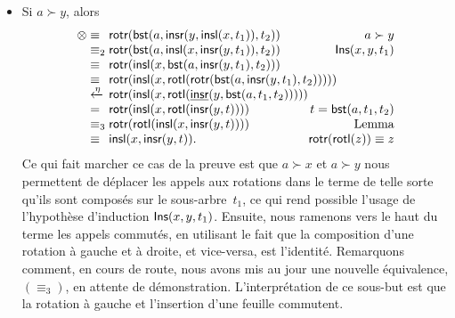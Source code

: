 \begin{itemize}
\begin{itemize}
    \item Si \(a \succ y\), alors
      \begin{equation*}
      \begin{array}{@{}r@{\;}l@{\;}l@{\hspace{-8mm}}r@{}}
        \otimes & \equiv &
        \fun{rotr}(\fun{bst}(a,\fun{insr}(y,\fun{insl}(x,t_1)),t_2))
        & \IH{a \succ y}\\
        & \equiv_2 & \fun{rotr}(\fun{bst}(a,\fun{insl}(x,
        \fun{insr}(y,t_1)),t_2))
        & \IH{\pred{Ins}{x,y,t_1}}\\
        & \equiv & \fun{rotr}(\fun{insl}(x,
        \fun{bst}(a,\fun{insr}(y,t_1),t_2)))\\
        & \equiv & \fun{rotr}(\fun{insl}(x,
        \fun{rotl}(\fun{rotr}(\fun{bst}(a,\fun{insr}(y,t_1),t_2)))))\\
        & \xleftarrow{\smash{\eta}} &
        \fun{rotr}(\fun{insl}(x,\fun{rotl}(\ufun{insr}(y,
        \fun{bst}(a,t_1,t_2)))))\\
        & = & \fun{rotr}(\fun{insl}(x,\fun{rotl}(\fun{insr}(y,t))))
        & \IH{t=\fun{bst}(a,t_1,t_2)}\\
        & \equiv_3 & \fun{rotr}(\fun{rotl}(\fun{insl}(x,
        \fun{insr}(y,t)))) & \IH{\text{Lemma}}\\
        & \equiv & \fun{insl}(x,\fun{insr}(y,t)).
        & \IH{\fun{rotr}(\fun{rotl}(z)) \equiv z}
      \end{array}
      \end{equation*}
      Ce qui fait marcher ce cas de la preuve est que \(a \succ x\) et
      \(a \succ y\) nous permettent de déplacer les appels aux
      rotations dans le terme de telle sorte qu'ils sont composés sur
      le sous-arbre~\(t_1\), ce qui rend possible l'usage de
      l'hypothèse d'induction \(\textsf{Ins}({x,y,t_1})\). Ensuite, nous
      ramenons vers le haut du terme les appels commutés, en utilisant
      le fait que la composition d'une rotation à gauche et à droite,
      et vice-versa, est l'identité. Remarquons comment, en cours de
      route, nous avons mis au jour une nouvelle équivalence,
      \((\equiv_3)\), en attente de démonstration. L'interprétation de
      ce sous-but est que la rotation à gauche et l'insertion d'une
      feuille commutent.


\end{itemize}
\end{itemize}
